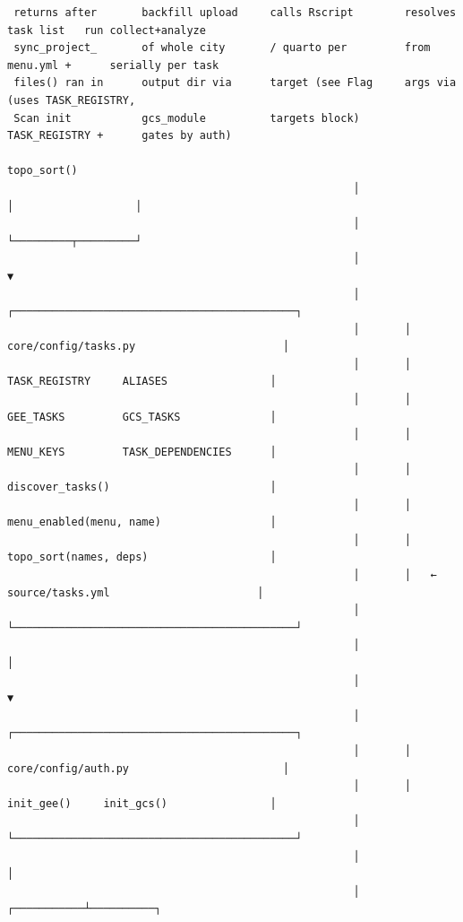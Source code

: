 \documentclass[
  letterpaper,
  DIV=11,
  numbers=noendperiod]{scrreprt}
\begin{document}
\begin{verbatim}
 returns after       backfill upload     calls Rscript        resolves task list   run collect+analyze
 sync_project_       of whole city       / quarto per         from menu.yml +      serially per task
 files() ran in      output dir via      target (see Flag     args via             (uses TASK_REGISTRY,
 Scan init           gcs_module          targets block)       TASK_REGISTRY +      gates by auth)
                                                              topo_sort()
                                                      │                   │                   │
                                                      │                   └─────────┬─────────┘
                                                      │                             ▼
                                                      │       ┌────────────────────────────────────────────┐
                                                      │       │ core/config/tasks.py                       │
                                                      │       │   TASK_REGISTRY     ALIASES                │
                                                      │       │   GEE_TASKS         GCS_TASKS              │
                                                      │       │   MENU_KEYS         TASK_DEPENDENCIES      │
                                                      │       │   discover_tasks()                         │
                                                      │       │   menu_enabled(menu, name)                 │
                                                      │       │   topo_sort(names, deps)                   │
                                                      │       │   ← source/tasks.yml                       │
                                                      │       └────────────────────────────────────────────┘
                                                      │                             │
                                                      │                             ▼
                                                      │       ┌────────────────────────────────────────────┐
                                                      │       │ core/config/auth.py                        │
                                                      │       │   init_gee()     init_gcs()                │
                                                      │       └────────────────────────────────────────────┘
                                                      │                             │
                                                      │                 ┌───────────┴──────────┐

\end{verbatim}
\end{document}
